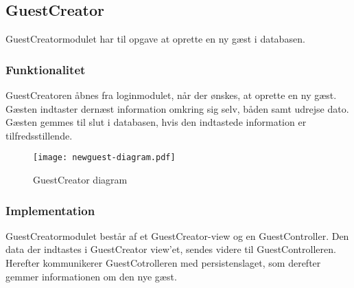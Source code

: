 \subsection{GuestCreator}
\label{sub:GuestCreator}

GuestCreatormodulet har til opgave at oprette en ny gæst i databasen.

\subsubsection{Funktionalitet}
\label{ssub:GuestCreator_funktionalitet}
GuestCreatoren åbnes fra loginmodulet, når der ønskes, at oprette en ny gæst. Gæsten indtaster dernæst information omkring sig selv, båden samt udrejse dato. Gæsten gemmes til slut i databasen, hvis den indtastede information er tilfredsstillende.

\begin{figure}
  \centering
  \texttt{[image: newguest-diagram.pdf]}
  \caption{GuestCreator diagram}
  \label{fig:guestcreator}
\end{figure}

\subsubsection{Implementation}
\label{ssub:GuestCreator_implementation}

GuestCreatormodulet består af et GuestCreator-view og en GuestController. Den data der indtastes i GuestCreator view'et, sendes videre til GuestControlleren. Herefter kommunikerer GuestCotrolleren med persistenslaget, som derefter gemmer informationen om den nye gæst.